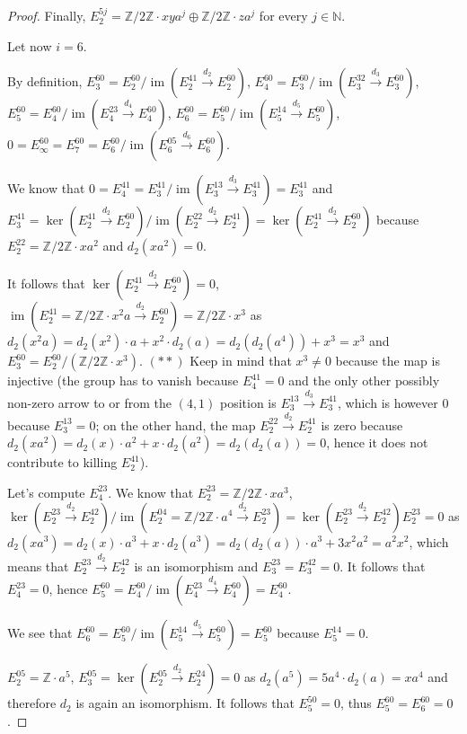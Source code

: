 \documentclass{article}
\newcommand{\numberset}{\mathbb}
\newcommand{\N}{\numberset{N}}
\newcommand{\Z}{\numberset{Z}}
\DeclareMathOperator{\im}{im}
\begin{document}
\begin{proof}
    Finally, $E^{5j}_2=\Z/2\Z\cdot xya^j\oplus\Z/2\Z\cdot za^j$ for every
    $j\in\N$.

    Let now $i=6$.

    By definition, $E^{60}_3=E^{60}_2/\im(E^{41}_2\xrightarrow{d_2}E^{60}_2)$,
    $E^{60}_4=E^{60}_3/\im(E^{32}_3\xrightarrow{d_3}E^{60}_3)$,
    $E^{60}_5=E^{60}_4/\im(E^{23}_4\xrightarrow{d_4}E^{60}_4)$,
    $E^{60}_6=E^{60}_5/\im(E^{14}_5\xrightarrow{d_5}E^{60}_5)$,
    $0=E^{60}_\infty=E^{60}_7=E^{60}_6/\im(E^{05}_6\xrightarrow{d_6}E^{60}_6)$.

    We know that
    $0=E^{41}_4=E^{41}_3/\im(E^{13}_3\xrightarrow{d_3}E^{41}_3)=E^{41}_3$ and
    $E^{41}_3=\ker(E^{41}_2\xrightarrow{d_2}E^{60}_2)/
    \im(E^{22}_2\xrightarrow{d_2}E^{41}_2)=\ker(E^{41}_2\xrightarrow{d_2}E^{60}_2)$
    because $E^{22}_2=\Z/2\Z\cdot xa^2$ and $d_2(xa^2)=0$.

    It follows that $\ker(E^{41}_2\xrightarrow{d_2}E^{60}_2)=0$,
    $\im(E^{41}_2=\Z/2\Z\cdot x^2a\xrightarrow{d_2}E^{60}_2)=\Z/2\Z\cdot x^3$ as
    $d_2(x^2a)=d_2(x^2)\cdot a+x^2\cdot d_2(a)=d_2(d_2(a^4))+x^3=x^3$ and
    $E^{60}_3=E^{60}_2/(\Z/2\Z\cdot x^3)$. $(**)$ Keep in mind that $x^3\neq 0$
    because the map is injective (the group has to vanish because $E^{41}_4=0$
    and the only other possibly non-zero arrow to
    or from the $(4,1)$ position is $E^{13}_3\xrightarrow{d_3}E^{41}_3$, which
    is however 0 because $E^{13}_3=0$; on the other hand, the map $E^{22}_2
    \xrightarrow{d_2}E^{41}_2$ is zero because $d_2(xa^2)=d_2(x)\cdot a^2+x\cdot
    d_2(a^2)=d_2(d_2(a))=0$, hence it does not contribute to killing $E^{41}_2$).

    Let's compute $E^{23}_4$. We know that $E^{23}_2=\Z/2\Z\cdot xa^3$,
    $\ker(E^{23}_2\xrightarrow{d_2}E^{42}_2)/\im(E^{04}_2=\Z/2\Z\cdot a^4
    \xrightarrow{d_2}E^{23}_2)=\ker(E^{23}_2\xrightarrow{d_2}E^{42}_2)
    E^{23}_2=0$ as $d_2(xa^3)=d_2(x)\cdot a^3+x\cdot d_2(a^3)=d_2(d_2(a))\cdot
    a^3+3x^2a^2=a^2x^2$, which means that $E^{23}_2\xrightarrow{d_2}E^{42}_2$ is
    an isomorphism and $E^{23}_3=E^{42}_3=0$. It follows that $E^{23}_4=0$,
    hence $E^{60}_5=E^{60}_4/\im(E^{23}_4\xrightarrow{d_4}E^{60}_4)=E^{60}_4$.

    We see that
    $E^{60}_6=E^{60}_5/\im(E^{14}_5\xrightarrow{d_5}E^{60}_5)=E^{60}_5$ because
    $E^{14}_5=0$.

    $E^{05}_2=\Z\cdot a^5$,
    $E^{05}_3=\ker(E^{05}_2\xrightarrow{d_2}E^{24}_2)=0$ as
    $d_2(a^5)=5a^4\cdot d_2(a)=xa^4$ and therefore $d_2$ is again an
    isomorphism. It follows that $E^{50}_5=0$, thus $E^{60}_5=E^{60}_6=0$.


\end{proof}
\end{document}
